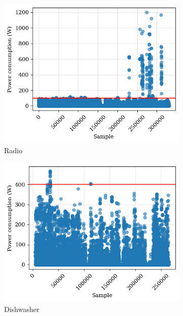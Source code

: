 \begin{figure}
    \begin{subfigure}{.5\textwidth}
      \centering
      \includegraphics[width=.9\linewidth]{images/raw_consumptions/audio_amplifier.png}
      \caption{Radio}
      \label{fig:radio}
    \end{subfigure}%
    \begin{subfigure}{.5\textwidth}
      \centering
      \includegraphics[width=.9\linewidth]{images/raw_consumptions/dish_washer.png}
      \caption{Dishwasher}
      \label{fig:dish_washer}
    \end{subfigure}
    \begin{subfigure}{.5\textwidth}
      \centering

\end{subfigure}
\end{figure}
